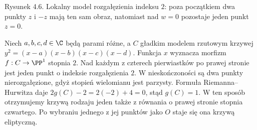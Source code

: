 \begin{center}
\begin{minipage}{.96\linewidth}
\centering
{}

{\small Rysunek 4.6. Lokalny model rozgałęzienia indeksu $2$:
poza początkiem dwa punkty $z$ i $-z$ mają ten sam obraz,
natomiast nad $w=0$ pozostaje jeden punkt $z=0$.}
\end{minipage}
\end{center}

\begin{przyklad}
Niech $a,b,c,d\in\C$ będą parami różne, a $C$ gładkim
modelem rzutowym krzywej
$y^2=(x-a)(x-b)(x-c)(x-d)$.
Funkcja $x$ wyznacza morfizm $f:C\to\PP^1$ stopnia $2$.
Nad każdym z czterech pierwiastków po prawej stronie
jest jeden punkt o indeksie rozgałęzienia $2$.
W nieskończoności są dwa punkty nierozgałęzione,
gdyż stopień wielomianu jest parzysty.
Formuła Riemanna--Hurwitza daje
$2g(C)-2=2(-2)+4=0$, stąd $g(C)=1$.
W ten sposób otrzymujemy krzywą rodzaju jeden także
z równania o prawej stronie stopnia czwartego.
Po wybraniu jednego z jej punktów jako $O$
staje się ona krzywą eliptyczną.
\end{przyklad}

